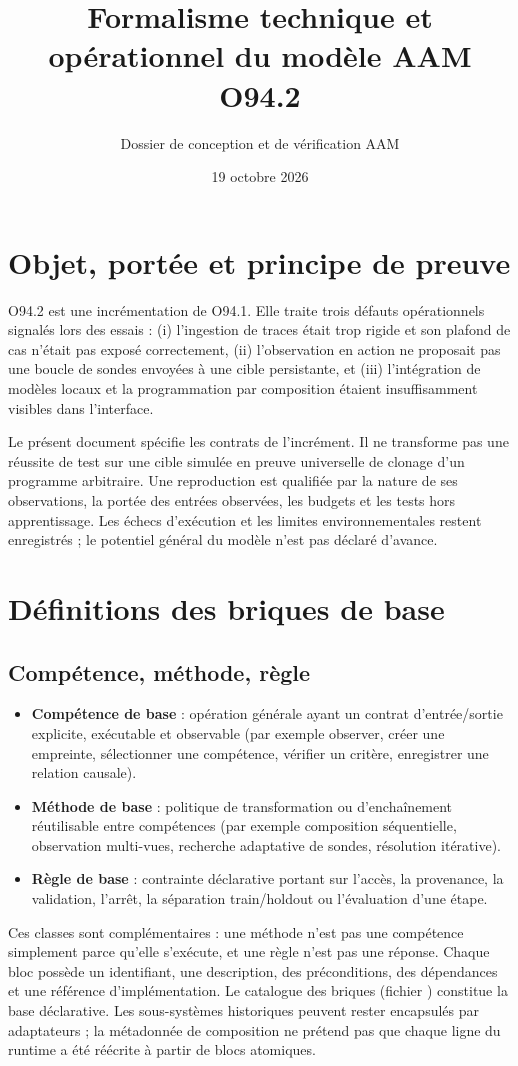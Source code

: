 \documentclass[11pt,a4paper]{article}
\title{Formalisme technique et opérationnel du modèle AAM O94.2}
\author{Dossier de conception et de vérification AAM}
\date{19 octobre 2026}
\begin{document}
\maketitle
\tableofcontents
\section{Objet, portée et principe de preuve}
O94.2 est une incrémentation de O94.1. Elle traite trois défauts opérationnels signalés lors des essais : (i) l'ingestion de traces était trop rigide et son plafond de cas n'était pas exposé correctement, (ii) l'observation en action ne proposait pas une boucle de sondes envoyées à une cible persistante, et (iii) l'intégration de modèles locaux et la programmation par composition étaient insuffisamment visibles dans l'interface.

Le présent document spécifie les contrats de l'incrément. Il ne transforme pas une réussite de test sur une cible simulée en preuve universelle de clonage d'un programme arbitraire. Une reproduction est qualifiée par la nature de ses observations, la portée des entrées observées, les budgets et les tests hors apprentissage. Les échecs d'exécution et les limites environnementales restent enregistrés ; le potentiel général du modèle n'est pas déclaré d'avance.

\section{Définitions des briques de base}
\subsection{Compétence, méthode, règle}
\begin{itemize}[leftmargin=1.5em]
  \item \textbf{Compétence de base} : opération générale ayant un contrat d'entrée/sortie explicite, exécutable et observable (par exemple observer, créer une empreinte, sélectionner une compétence, vérifier un critère, enregistrer une relation causale).
  \item \textbf{Méthode de base} : politique de transformation ou d'enchaînement réutilisable entre compétences (par exemple composition séquentielle, observation multi-vues, recherche adaptative de sondes, résolution itérative).
  \item \textbf{Règle de base} : contrainte déclarative portant sur l'accès, la provenance, la validation, l'arrêt, la séparation train/holdout ou l'évaluation d'une étape.
\end{itemize}
Ces classes sont complémentaires : une méthode n'est pas une compétence simplement parce qu'elle s'exécute, et une règle n'est pas une réponse. Chaque bloc possède un identifiant, une description, des préconditions, des dépendances et une référence d'implémentation. Le catalogue des briques (fichier ) constitue la base déclarative. Les sous-systèmes historiques peuvent rester encapsulés par adaptateurs ; la métadonnée de composition ne prétend pas que chaque ligne du runtime a été réécrite à partir de blocs atomiques.
\end{document}
